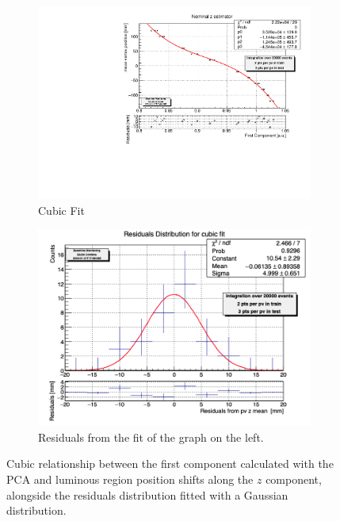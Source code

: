 \begin{figure}
    \centering
    \begin{subfigure}{0.48\textwidth}
    \includegraphics[width=\linewidth]{figures/z_cubic_fit.pdf}
    \caption{Cubic Fit}\label{fig:zfit_cubic_MC}
    \end{subfigure}
    \begin{subfigure}{0.48\textwidth}
    \includegraphics[width=\linewidth]{figures/z_cubic_res.png}
    \caption{Residuals from the fit of the graph on the left. }\label{fig:zres_cubic_MC}
    \end{subfigure}
    \caption{Cubic relationship between the first component calculated with the PCA and luminous region position shifts along the $z$ component, alongside the residuals distribution fitted with a Gaussian distribution.}
    \label{fig:z_cubic_MC}
\end{figure}
 
